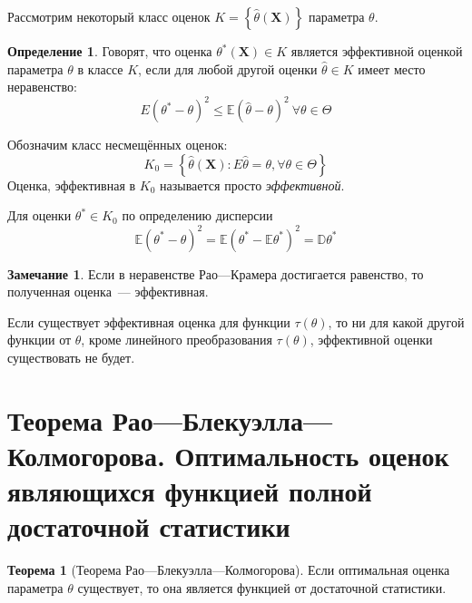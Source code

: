 \documentclass[oneside,final,14pt]{extreport}
\theoremstyle{plain}
\theoremstyle{definition}
\newtheorem*{defn}{Определение}
\newtheorem*{rmrk}{Замечание}
\theoremstyle{named}
\newtheorem*{namedthm}{Теорема}
\begin{document}
Рассмотрим некоторый класс оценок $K=\left\{\hat{\theta}\left(\mathbf{X}\right)\right\}$ параметра $\theta$.
\begin{defn}
    Говорят, что оценка $\theta^{*}\left(\mathbf{X}\right) \in K$ является эффективной оценкой параметра $\theta$ в классе $K$, если для любой другой оценки $\hat{\theta} \in K$ имеет место неравенство:
    \begin{equation*}
        E\left(\theta^{*}-\theta\right)^{2} \leqslant \mathbb{E}(\hat{\theta}-\theta)^{2}~ \forall \theta \in \Theta
    \end{equation*}
\end{defn}
Обозначим класс несмещённых оценок:
\begin{equation*}
    K_{0}=\left\{\hat{\theta}\left(\mathbf{X}\right): E \hat{\theta}=\theta, \forall \theta \in \Theta\right\}
\end{equation*}
Оценка, эффективная в $K_0$ называется просто {\it эффективной}.

Для оценки $\theta^{*} \in K_{0}$ по определению дисперсии
\begin{equation*}
    \mathbb{E}\left(\theta^{*}-\theta\right)^{2}=\mathbb{E}\left(\theta^{*}-\mathbb{E} \theta^{*}\right)^{2}=\mathbb{D} \theta^{*}
\end{equation*}

\begin{rmrk}
Если в неравенстве Рао---Крамера достигается равенство, то полученная оценка~--- эффективная.

Если существует эффективная оценка для функции $\tau(\theta)$, то ни для какой другой функции от $\theta$, кроме линейного преобразования $\tau(\theta)$, эффективной оценки существовать не будет. 
\end{rmrk}

\section{Теорема Рао—Блекуэлла—Колмогорова. Оптимальность оценок являющихся функцией полной достаточной статистики}

\begin{namedthm}[Теорема Рао—Блекуэлла—Колмогорова] Если оптимальная оценка параметра $\theta$ существует, то она является функцией от достаточной статистики.
\end{namedthm}
\end{document}
